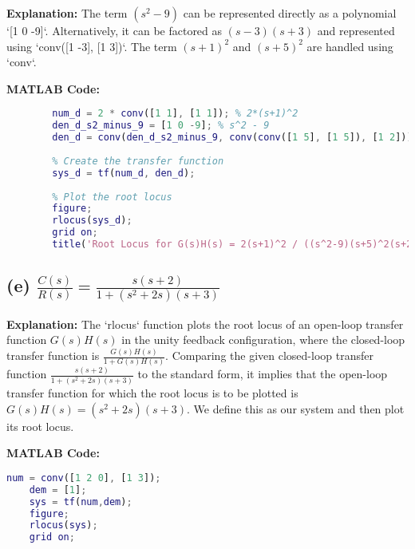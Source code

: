 \documentclass[a4paper,12pt]{article}
\begin{document}
	\textbf{Explanation:}
	The term $(s^2-9)$ can be represented directly as a polynomial `[1 0 -9]`. Alternatively, it can be factored as $(s-3)(s+3)$ and represented using `conv([1 -3], [1 3])`. The term $(s+1)^2$ and $(s+5)^2$ are handled using `conv`.
	
	\textbf{MATLAB Code:}
	\begin{lstlisting}[language=Matlab, caption=MATLAB Code for System (d)]
		% Define the numerator and denominator polynomials
		num_d = 2 * conv([1 1], [1 1]); % 2*(s+1)^2
		den_d_s2_minus_9 = [1 0 -9]; % s^2 - 9
		den_d = conv(den_d_s2_minus_9, conv(conv([1 5], [1 5]), [1 2])); % (s^2-9)*(s+5)^2*(s+2)
		
		% Create the transfer function
		sys_d = tf(num_d, den_d);
		
		% Plot the root locus
		figure;
		rlocus(sys_d);
		grid on;
		title('Root Locus for G(s)H(s) = 2(s+1)^2 / ((s^2-9)(s+5)^2(s+2))');
	\end{lstlisting}
	
	\subsection*{(e) $\frac{C(s)}{R(s)} = \frac{s(s+2)}{1+(s^2+2s)(s+3)}$}
	
	\textbf{Explanation:}
	The `rlocus` function plots the root locus of an open-loop transfer function $G(s)H(s)$ in the unity feedback configuration, where the closed-loop transfer function is $\frac{G(s)H(s)}{1+G(s)H(s)}$. Comparing the given closed-loop transfer function $\frac{s(s+2)}{1+(s^2+2s)(s+3)}$ to the standard form, it implies that the open-loop transfer function for which the root locus is to be plotted is $G(s)H(s) = (s^2+2s)(s+3)$. We define this as our system and then plot its root locus.
	
	\textbf{MATLAB Code:}
	\begin{lstlisting}[language=Matlab, caption=MATLAB Code for System (e)]
	num = conv([1 2 0], [1 3]);
	dem = [1];
	sys = tf(num,dem);
	figure;
	rlocus(sys);
	grid on;
	\end{lstlisting}
	
\end{document}
